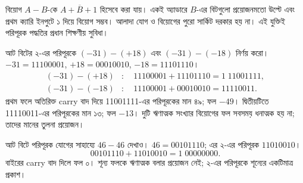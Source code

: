 বিয়োগ $A-B$-কে $A+\overline B+1$ হিসেবে করা যায়। একই অ্যাডারে $B$-এর বিটগুলো প্রয়োজনমতো উল্টে এবং প্রথম ক্যারি ইনপুটে ১ দিয়ে বিয়োগ সম্ভব। আলাদা যোগ ও বিয়োগের পুরো সার্কিট দরকার হয় না। এই যুক্তিই পরিপূরক পদ্ধতির প্রধান শিক্ষণীয় সুবিধা।

আট বিটের ২-এর পরিপূরকে $(-31)-(+18)$ এবং $(-31)-(-18)$ নির্ণয় করো।
\chThreeAnswer $-31=11100001$, $+18=00010010$, $-18=11101110$।
\[\begin{aligned}
(-31)-(+18)&:\quad11100001+11101110=1\;11001111,\\
(-31)-(-18)&:\quad11100001+00010010=11110011.
\end{aligned}\]
প্রথম ফলে অতিরিক্ত carry বাদ দিয়ে 11001111-এর পরিপূরকের মান ৪৯; ফল $-49$। দ্বিতীয়টিতে 11110011-এর পরিপূরকের মান ১৩; ফল $-13$। দুটি ঋণাত্মক সংখ্যার বিয়োগের ফল সবসময় ধনাত্মক হয় না; তাদের মানের তুলনা প্রয়োজন।

আট বিটে পরিপূরক যোগের সাহায্যে $46-46$ দেখাও।
\chThreeAnswer $46=00101110$; এর ২-এর পরিপূরক $11010010$।
\[00101110+11010010=1\;00000000.\]
বাইরের carry বাদ দিলে ফল ০। শূন্য ফলকে ঋণাত্মক বলার প্রয়োজন নেই; ২-এর পরিপূরকে শূন্যের একটিমাত্র প্রকাশ।
